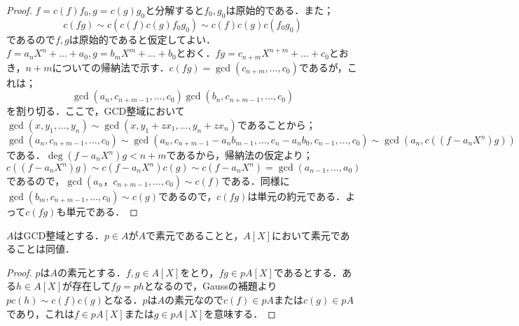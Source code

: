 \begin{proof}
	$f=c(f)f_0,g=c(g)g_0$と分解すると$f_0,g_0$は原始的である．また；
	\[c(fg)\sim c(c(f)c(g)f_0g_0)\sim c(f)c(g)c(f_0g_0)\]
	であるので$f,g$は原始的であると仮定してよい．$f=a_nX^n+\dots+a_0,g=b_mX^m+\dots+b_0$とおく．$fg=c_{n+m}X^{n+m}+\dots+c_0$とおき，$n+m$についての帰納法で示す．$c(fg)=\gcd(c_{n+m},\dots,c_0)$であるが，これは；
	\[\gcd(a_n,c_{n+m-1},\dots, c_0)\gcd(b_n,c_{n+m-1},\dots,c_0)\]
	を割り切る．ここで，GCD整域において$\gcd(x,y_1,\dots,y_n)\sim\gcd(x,y_1+zx_1,\dots,y_n+zx_n)$であることから；
	\[\gcd(a_n,c_{n+m-1},\dots,c_0)\sim\gcd(a_n,c_{n+m-1}-a_nb_{m-1},\dots,c_n-a_nb_0,c_{n-1},\dots,c_0)\sim\gcd(a_n, c((f-a_nX^n)g))\]
	である．$\deg(f-a_nX^n)g<n+m$であるから，帰納法の仮定より；
	\[c((f-a_nX^n)g)\sim c(f-a_nX^n)c(g)\sim c(f-a_nX^n)=\gcd(a_{n-1},\dots,a_0)\]
	であるので，$\gcd(a_n，c_{n+m-1},\dots,c_0)\sim c(f)$である．同様に$\gcd(b_m,c_{n+m-1},\dots,c_0)\sim c(g)$であるので，$c(fg)$は単元の約元である．よって$c(fg)$も単元である．
\end{proof}

%

\begin{prop}
	$A$はGCD整域とする．$p\in A$が$A$で素元であることと，$A[X]$において素元であることは同値．
\end{prop}

\begin{proof}
	$p$は$A$の素元とする．$f,g\in A[X]$をとり，$fg\in pA[X]$であるとする．ある$h\in A[X]$が存在して$fg=ph$となるので，Gaussの補題より$pc(h)\sim c(f)c(g)$となる．$p$は$A$の素元なので$c(f)\in pA$または$c(g)\in pA$であり，これは$f\in pA[X]$または$g\in pA[X]$を意味する．
\end{proof}

